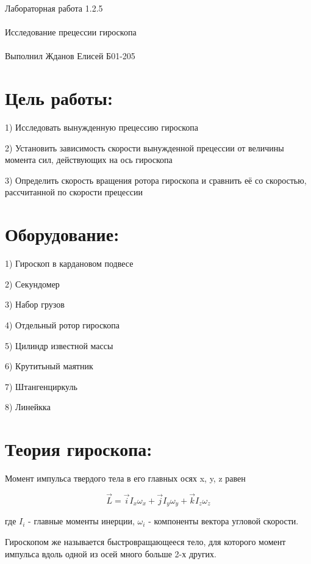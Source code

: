 \documentclass{astroedu-lab}
\begin{document}
\pagestyle{plain}

\begin{problem}{\huge Лабораторная работа 1.2.5\\\\Исследование прецессии гироскопа\\\\Выполнил Жданов Елисей Б01-205}

\section{Цель работы:}

1) Исследовать вынужденную прецессию гироскопа

2) Установить зависимость скорости вынужденной прецессии от величины момента сил, действующих на ось гироскопа

3) Определить скорость вращения ротора гироскопа и сравнить её со скоростью, рассчитанной по скорости прецессии

\section{Оборудование:}

1) Гироскоп в кардановом подвесе

2) Секундомер

3) Набор грузов

4) Отдельный ротор гироскопа

5) Цилиндр известной массы

6) Крутитьный маятник

7) Штангенциркуль

8) Линейкка

\section{Теория гироскопа:}

Момент импульса твердого тела в его главных осях x, y, z равен

\begin{equation}
	\vec L = \vec i I_x \omega_x + \vec j I_y \omega_y + \vec k I_z \omega_z
\end{equation}

где $I_i$ - главные моменты инерции, $\omega_i$ - компоненты вектора угловой скорости.

Гироскопом же называется быстровращающееся тело, для которого момент импульса вдоль одной из осей много больше 2-х других.


\end{problem}
\end{document}

